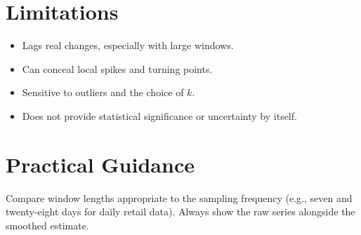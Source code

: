 \documentclass[a4paper]{article}
\begin{document}
\section{Limitations}
\begin{itemize}
 \item Lags real changes, especially with large windows.
 \item Can conceal local spikes and turning points.
 \item Sensitive to outliers and the choice of $k$.
 \item Does not provide statistical significance or uncertainty by itself.
\end{itemize}

\section{Practical Guidance}
Compare window lengths appropriate to the sampling frequency (e.g., seven and twenty-eight days for daily retail data). Always show the raw series alongside the smoothed estimate.



\end{document}
